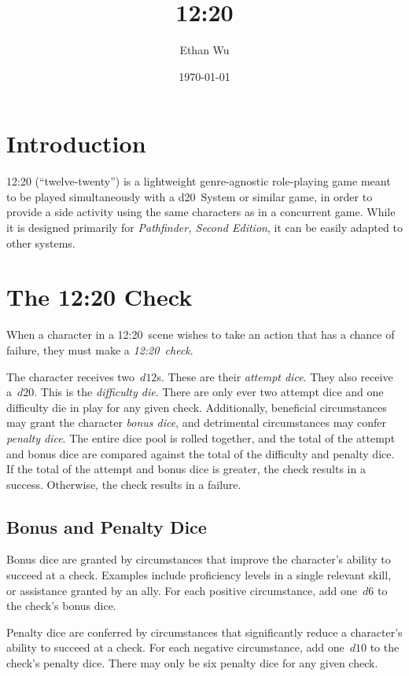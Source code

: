 \documentclass[twocolumn]{article}
\title{12:20}
\author{Ethan Wu}
\date{\today}
\begin{document}
\maketitle

\section{Introduction}

12:20 (``twelve-twenty'') is a lightweight genre-agnostic role-playing game
meant to be played simultaneously with a d20~System or similar game, in order to
provide a side activity using the same characters as in a concurrent game. While
it is designed primarily for \emph{Pathfinder, Second Edition}, it can be easily
adapted to other systems.

\section{The 12:20 Check}
When a character in a 12:20~scene wishes to take an action that has a chance of
failure, they must make a \emph{12:20~check}.

The character receives two~$d12$s. These are their \emph{attempt dice}. They
also receive a~$d20$. This is the \emph{difficulty die}. There are only ever
two attempt dice and one difficulty die in play for any given check.
Additionally, beneficial circumstances may grant the character \emph{bonus
dice}, and detrimental circumstances may confer \emph{penalty dice}. The
entire dice pool is rolled together, and the total of the attempt and bonus dice
are compared against the total of the difficulty and penalty dice. If the total
of the attempt and bonus dice is greater, the check results in a success.
Otherwise, the check results in a failure.

\subsection{Bonus and Penalty Dice}
Bonus dice are granted by circumstances that improve the character's ability to
succeed at a check. Examples include proficiency levels in a single relevant
skill, or assistance granted by an ally. For each positive circumstance, add
one~$d6$ to the check's bonus dice.

Penalty dice are conferred by circumstances that significantly reduce a
character's ability to succeed at a check. For each negative circumstance, add
one~$d10$ to the check's penalty dice. There may only be six penalty dice for
any given check.
\end{document}
